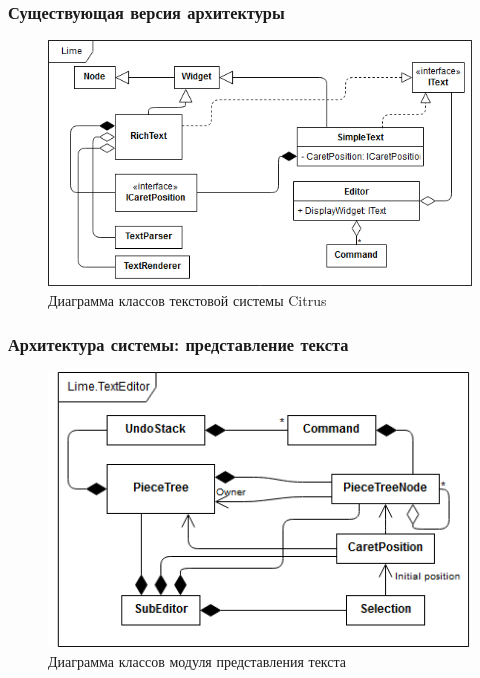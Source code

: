 \documentclass[10pt, unicode]{beamer}
\begin{document}
    \begin{frame}
        \frametitle{Существующая версия архитектуры}
        \begin{figure}
            \centering
            \includegraphics[width=\textwidth]{diagrams/CitrusTextSystem.png}
            \caption{Диаграмма классов текстовой системы Citrus}
        \end{figure}
    \end{frame}
    \begin{frame}
        \frametitle{Архитектура системы: представление текста}
        \begin{figure}
            \centering
            \includegraphics[width=\textwidth]{diagrams/SubEditorScheme.png}
            \caption{Диаграмма классов модуля представления текста}
        \end{figure}
    \end{frame}
\end{document}
